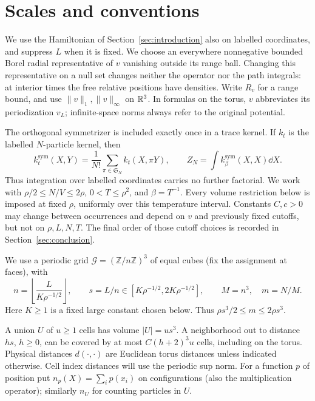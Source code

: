 \section{Scales and conventions}\label{sec:setup}

We use the Hamiltonian of Section~\ref{sec:introduction} also on labelled
coordinates, and suppress $L$ when it is fixed. We choose an everywhere
nonnegative bounded Borel radial representative of $v$ vanishing outside
its range ball. Changing this representative on a null set changes neither
the operator nor the path integrals: at interior times the free relative
positions have densities. Write $R_v$ for a range bound, and use
$\|v\|_1,\|v\|_\infty$ on $\mathbb R^3$. In formulas on the torus,
$v$ abbreviates its periodization $v_L$; infinite-space norms always
refer to the original potential.

The orthogonal symmetrizer is included exactly once in a trace kernel.
If $k_t$ is the labelled $N$-particle kernel, then
\[
 k_t^{\mathrm{sym}}(X,Y)=\frac1{N!}\sum_{\pi\in\mathfrak S_N}
                         k_t(X,\pi Y),\qquad
 Z_N=\int k_\beta^{\mathrm{sym}}(X,X)\dd X.
\]
Thus integration over labelled coordinates carries no further factorial.
We work with $\rho/2\le N/V\le2\rho$, $0<T\le\rho^2$, and
$\beta=T^{-1}$. Every volume restriction below is imposed at fixed $\rho$,
uniformly over this temperature interval. Constants $C,c>0$ may change
between occurrences and depend on $v$ and previously fixed cutoffs,
but not on $\rho,L,N,T$. The final order of those cutoff choices is
recorded in Section~\ref{sec:conclusion}.

We use a periodic grid \(\mathcal G=(\mathbb Z/n\mathbb Z)^3\) of equal cubes (fix the assignment at faces), with
\[
 n=\left\lfloor\frac{L}{K\rho^{-1/2}}\right\rfloor,\qquad
 s=L/n\in[K\rho^{-1/2},2K\rho^{-1/2}],\qquad
 M=n^3,\quad m=N/M .
\]
Here \(K\ge1\) is a fixed large constant chosen below. Thus \(\rho s^3/2\le m\le 2\rho s^3\). 

A union \(U\) of \(u\ge1\) cells has volume \(|U|=u s^3\). A neighborhood out to distance \(h s\), \(h\ge0\), can be covered by at most \(C(h+2)^3 u\) cells, including on the torus. Physical distances \(d(\cdot,\cdot)\) are Euclidean torus distances unless indicated otherwise. Cell index distances will use the periodic sup norm. For a function \(p\) of position put \(n_p(X)=\sum_i p(x_i)\) on configurations (also the multiplication operator); similarly \(n_U\) for counting particles in \(U\).

